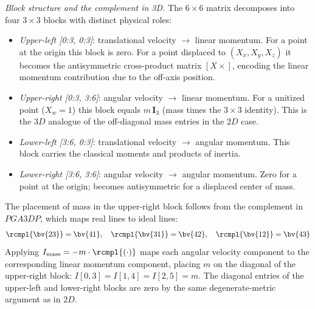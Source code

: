 \emph{Block structure and the complement in 3D.} The $6\times6$ matrix decomposes into
four $3\times3$ blocks with distinct physical roles:
\begin{itemize}
    \item \emph{Upper-left [0:3, 0:3]}: translational velocity $\to$ linear momentum. For
    a point at the origin this block is zero. For a point displaced to $(X_x, X_y, X_z)$
    it becomes the antisymmetric cross-product matrix $[X\times]$, encoding the linear
    momentum contribution due to the off-axis position.
    \item \emph{Upper-right [0:3, 3:6]}: angular velocity $\to$ linear momentum. For a
    unitized point ($X_w = 1$) this block equals $m\,\mathbf{I}_3$ (mass times the
    $3\times3$ identity). This is the $3D$ analogue of the off-diagonal mass entries in
    the $2D$ case.
    \item \emph{Lower-left [3:6, 0:3]}: translational velocity $\to$ angular momentum.
    This block carries the classical moments and products of inertia.
    \item \emph{Lower-right [3:6, 3:6]}: angular velocity $\to$ angular momentum. Zero for
    a point at the origin; becomes antisymmetric for a displaced center of mass.
\end{itemize}

The placement of mass in the upper-right block follows from the complement in $PGA3DP$,
which maps real lines to ideal lines:
\begin{equation}
    \rcmpl{\bv{23}} = \bv{41}, \quad \rcmpl{\bv{31}} = \bv{42}, \quad
    \rcmpl{\bv{12}} = \bv{43}
    \label{eq:dual_pga3dp}
\end{equation}
Applying $I_\mathrm{mass} = -m \cdot \rcmpl{(\cdot)}$ maps each angular velocity component
to the corresponding linear momentum component, placing $m$ on the diagonal of the
upper-right block: $I[0,3] = I[1,4] = I[2,5] = m$. The diagonal entries of the upper-left
and lower-right blocks are zero by the same degenerate-metric argument as in $2D$. \\

